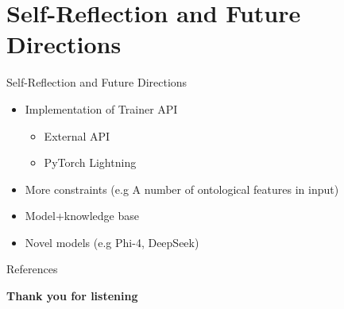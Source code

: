 \documentclass[aspectratio=169,xcolor=dvipsnames]{beamer}
\begin{document}
\section{Self-Reflection and Future Directions}
\begin{frame}{Self-Reflection and Future Directions}
\begin{itemize}
    \item Implementation of Trainer API
    \begin{itemize}
        \item External API
        \item PyTorch Lightning
    \end{itemize}
    \item More constraints (e.g A number of ontological features in input)
    \item Model+knowledge base
    \item Novel models (e.g Phi-4, DeepSeek)
\end{itemize}
\end{frame}

\begin{frame}{References}
    \footnotesize
    
    
\end{frame}


\begin{frame}
    \Huge{\centerline{\textbf{Thank you for listening}}}
\end{frame}

\end{document}
